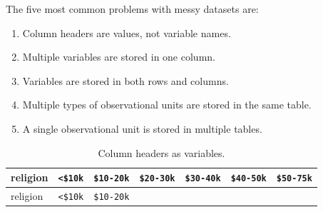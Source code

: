 \documentclass[12pt,oneside]{reedthesis}
\providecommand{\tightlist}{%
  \setlength{\itemsep}{0pt}\setlength{\parskip}{0pt}}
\theoremstyle{definition}
\theoremstyle{definition}
\theoremstyle{definition}
\theoremstyle{remark}
\begin{document}
The five most common problems with messy datasets are:
\begin{enumerate}
\def\labelenumi{\arabic{enumi}.}
\tightlist
\item
  Column headers are values, not variable names.
\item
  Multiple variables are stored in one column.
\item
  Variables are stored in both rows and columns.
\item
  Multiple types of observational units are stored in the same table.
\item
  A single observational unit is stored in multiple tables.
\end{enumerate}
\begin{longtable}[]{@{}lllllll@{}}
\caption{Column headers as variables.}\tabularnewline
\toprule
\begin{minipage}[b]{0.16\columnwidth}\raggedright\strut
religion\strut
\end{minipage} & \begin{minipage}[b]{0.09\columnwidth}\raggedright\strut
\texttt{\textless{}\$10k}\strut
\end{minipage} & \begin{minipage}[b]{0.11\columnwidth}\raggedright\strut
\texttt{\$10-20k}\strut
\end{minipage} & \begin{minipage}[b]{0.11\columnwidth}\raggedright\strut
\texttt{\$20-30k}\strut
\end{minipage} & \begin{minipage}[b]{0.11\columnwidth}\raggedright\strut
\texttt{\$30-40k}\strut
\end{minipage} & \begin{minipage}[b]{0.11\columnwidth}\raggedright\strut
\texttt{\$40-50k}\strut
\end{minipage} & \begin{minipage}[b]{0.11\columnwidth}\raggedright\strut
\texttt{\$50-75k}\strut
\end{minipage}\tabularnewline
\midrule
\endfirsthead
\toprule
\begin{minipage}[b]{0.16\columnwidth}\raggedright\strut
religion\strut
\end{minipage} & \begin{minipage}[b]{0.09\columnwidth}\raggedright\strut
\texttt{\textless{}\$10k}\strut
\end{minipage} & \begin{minipage}[b]{0.11\columnwidth}\raggedright\strut
\texttt{\$10-20k}\strut

\end{minipage}
\end{longtable}
\end{document}
